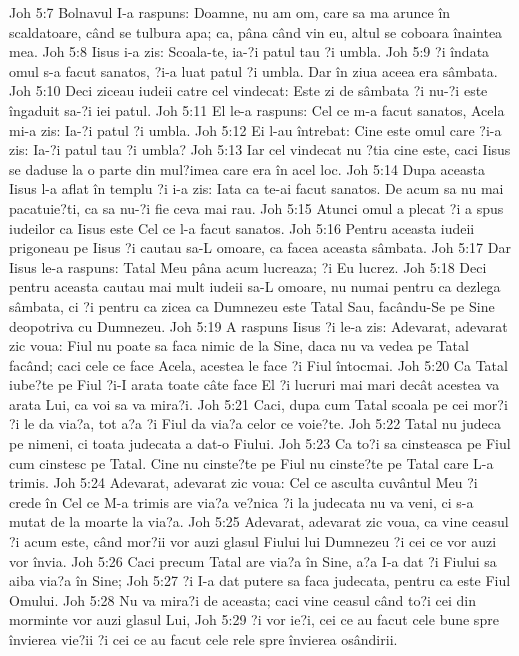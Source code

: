 Joh 5:7  Bolnavul I-a raspuns: Doamne, nu am om, care sa ma arunce în scaldatoare, când se tulbura apa; ca, pâna când vin eu, altul se coboara înaintea mea.
Joh 5:8  Iisus i-a zis: Scoala-te, ia-?i patul tau ?i umbla.
Joh 5:9  ?i îndata omul s-a facut sanatos, ?i-a luat patul ?i umbla. Dar în ziua aceea era sâmbata.
Joh 5:10  Deci ziceau iudeii catre cel vindecat: Este zi de sâmbata ?i nu-?i este îngaduit sa-?i iei patul.
Joh 5:11  El le-a raspuns: Cel ce m-a facut sanatos, Acela mi-a zis: Ia-?i patul ?i umbla.
Joh 5:12  Ei l-au întrebat: Cine este omul care ?i-a zis: Ia-?i patul tau ?i umbla?
Joh 5:13  Iar cel vindecat nu ?tia cine este, caci Iisus se daduse la o parte din mul?imea care era în acel loc.
Joh 5:14  Dupa aceasta Iisus l-a aflat în templu ?i i-a zis: Iata ca te-ai facut sanatos. De acum sa nu mai pacatuie?ti, ca sa nu-?i fie ceva mai rau.
Joh 5:15  Atunci omul a plecat ?i a spus iudeilor ca Iisus este Cel ce l-a facut sanatos.
Joh 5:16  Pentru aceasta iudeii prigoneau pe Iisus ?i cautau sa-L omoare, ca facea aceasta sâmbata.
Joh 5:17  Dar Iisus le-a raspuns: Tatal Meu pâna acum lucreaza; ?i Eu lucrez.
Joh 5:18  Deci pentru aceasta cautau mai mult iudeii sa-L omoare, nu numai pentru ca dezlega sâmbata, ci ?i pentru ca zicea ca Dumnezeu este Tatal Sau, facându-Se pe Sine deopotriva cu Dumnezeu.
Joh 5:19  A raspuns Iisus ?i le-a zis: Adevarat, adevarat zic voua: Fiul nu poate sa faca nimic de la Sine, daca nu va vedea pe Tatal facând; caci cele ce face Acela, acestea le face ?i Fiul întocmai.
Joh 5:20  Ca Tatal iube?te pe Fiul ?i-I arata toate câte face El ?i lucruri mai mari decât acestea va arata Lui, ca voi sa va mira?i.
Joh 5:21  Caci, dupa cum Tatal scoala pe cei mor?i ?i le da via?a, tot a?a ?i Fiul da via?a celor ce voie?te.
Joh 5:22  Tatal nu judeca pe nimeni, ci toata judecata a dat-o Fiului.
Joh 5:23  Ca to?i sa cinsteasca pe Fiul cum cinstesc pe Tatal. Cine nu cinste?te pe Fiul nu cinste?te pe Tatal care L-a trimis.
Joh 5:24  Adevarat, adevarat zic voua: Cel ce asculta cuvântul Meu ?i crede în Cel ce M-a trimis are via?a ve?nica ?i la judecata nu va veni, ci s-a mutat de la moarte la via?a.
Joh 5:25  Adevarat, adevarat zic voua, ca vine ceasul ?i acum este, când mor?ii vor auzi glasul Fiului lui Dumnezeu ?i cei ce vor auzi vor învia.
Joh 5:26  Caci precum Tatal are via?a în Sine, a?a I-a dat ?i Fiului sa aiba via?a în Sine;
Joh 5:27  ?i I-a dat putere sa faca judecata, pentru ca este Fiul Omului.
Joh 5:28  Nu va mira?i de aceasta; caci vine ceasul când to?i cei din morminte vor auzi glasul Lui,
Joh 5:29  ?i vor ie?i, cei ce au facut cele bune spre învierea vie?ii ?i cei ce au facut cele rele spre învierea osândirii.
